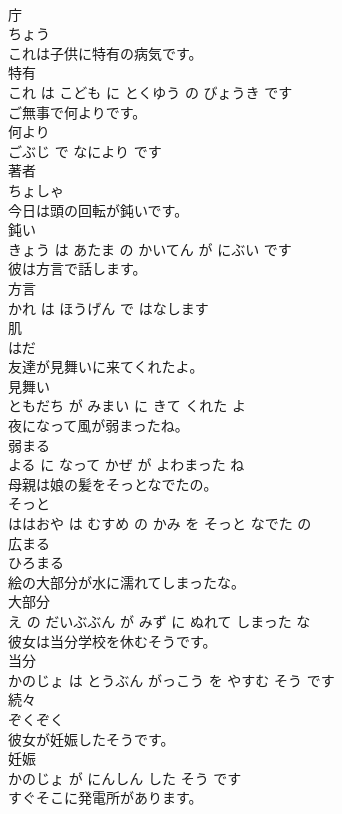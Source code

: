 \documentclass[8pt]{extreport}
\begin{document}
\begin{CJK}{UTF8}{min}
\\	庁	
\\	ちょう			
\\	これは子供に特有の病気です。	
\\	特有 
\\	これ は こども に とくゆう の びょうき です			
\\	ご無事で何よりです。	
\\	何より 
\\	ごぶじ で なにより です			
\\	著者	
\\	ちょしゃ			
\\	今日は頭の回転が鈍いです。	
\\	鈍い 
\\	きょう は あたま の かいてん が にぶい です			
\\	彼は方言で話します。	
\\	方言 
\\	かれ は ほうげん で はなします			
\\	肌	
\\	はだ			
\\	友達が見舞いに来てくれたよ。	
\\	見舞い 
\\	ともだち が みまい に きて くれた よ			
\\	夜になって風が弱まったね。	
\\	弱まる 
\\	よる に なって かぜ が よわまった ね			
\\	母親は娘の髪をそっとなでたの。	
\\	そっと 
\\	ははおや は むすめ の かみ を そっと なでた の			
\\	広まる	
\\	ひろまる			
\\	絵の大部分が水に濡れてしまったな。	
\\	大部分 
\\	え の だいぶぶん が みず に ぬれて しまった な			
\\	彼女は当分学校を休むそうです。	
\\	当分 
\\	かのじょ は とうぶん がっこう を やすむ そう です			
\\	続々	
\\	ぞくぞく			
\\	彼女が妊娠したそうです。	
\\	妊娠 
\\	かのじょ が にんしん した そう です			
\\	すぐそこに発電所があります。	

\end{CJK}
\end{document}
